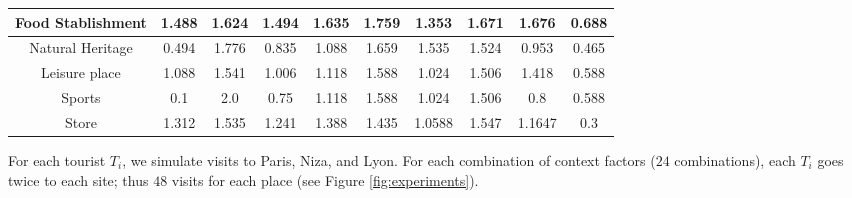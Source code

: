 \begin{table}[h!]
{\begin{tabular}{ |c|c|c|c|c|c|c|c|c|c| }
    Food Stablishment &
    1.488  & 1.624 & 1.494  & 1.635  & 1.759 & 1.353 & 1.671 & 1.676  & 0.688  \\ \hline
    
    Natural Heritage &
    0.494  & 1.776 & 0.835  & 1.088  & 1.659 & 1.535  & 1.524 & 0.953 & 0.465 \\ \hline
    
    Leisure place &
    1.088  & 1.541  & 1.006 & 1.118 & 1.588  & 1.024 & 1.506 & 1.418 & 0.588  \\ \hline
    
    Sports &
    0.1 & 2.0 & 0.75 & 1.118 & 1.588  & 1.024 & 1.506 & 0.8 & 0.588  \\ \hline
    
    Store &
    1.312 & 1.535  & 1.241  & 1.388  & 1.435  &1.0588  & 1.547  & 1.1647  & 0.3 \\ \hline


\end{tabular}
}
\vspace{-0.2cm}
\end{table}

For each tourist $T_i$, we simulate visits to Paris, Niza, and Lyon. For each combination of context factors ($24$ combinations),  each $T_i$ goes twice to each site; thus $48$ visits for each place (see Figure \ref{fig:experiments}).



